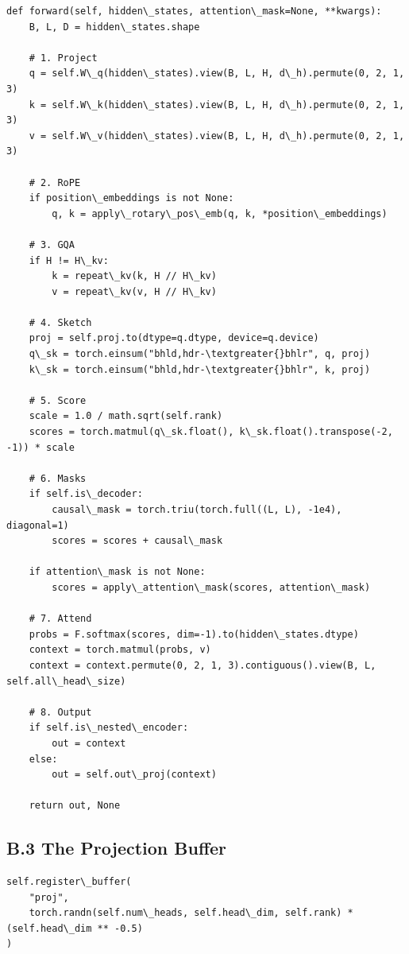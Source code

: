 \begin{lstlisting}
def forward(self, hidden\_states, attention\_mask=None, **kwargs):
    B, L, D = hidden\_states.shape
    
    # 1. Project
    q = self.W\_q(hidden\_states).view(B, L, H, d\_h).permute(0, 2, 1, 3)
    k = self.W\_k(hidden\_states).view(B, L, H, d\_h).permute(0, 2, 1, 3)
    v = self.W\_v(hidden\_states).view(B, L, H, d\_h).permute(0, 2, 1, 3)
    
    # 2. RoPE
    if position\_embeddings is not None:
        q, k = apply\_rotary\_pos\_emb(q, k, *position\_embeddings)
    
    # 3. GQA
    if H != H\_kv:
        k = repeat\_kv(k, H // H\_kv)
        v = repeat\_kv(v, H // H\_kv)
    
    # 4. Sketch
    proj = self.proj.to(dtype=q.dtype, device=q.device)
    q\_sk = torch.einsum("bhld,hdr-\textgreater{}bhlr", q, proj)
    k\_sk = torch.einsum("bhld,hdr-\textgreater{}bhlr", k, proj)
    
    # 5. Score
    scale = 1.0 / math.sqrt(self.rank)
    scores = torch.matmul(q\_sk.float(), k\_sk.float().transpose(-2, -1)) * scale
    
    # 6. Masks
    if self.is\_decoder:
        causal\_mask = torch.triu(torch.full((L, L), -1e4), diagonal=1)
        scores = scores + causal\_mask
    
    if attention\_mask is not None:
        scores = apply\_attention\_mask(scores, attention\_mask)
    
    # 7. Attend
    probs = F.softmax(scores, dim=-1).to(hidden\_states.dtype)
    context = torch.matmul(probs, v)
    context = context.permute(0, 2, 1, 3).contiguous().view(B, L, self.all\_head\_size)
    
    # 8. Output
    if self.is\_nested\_encoder:
        out = context
    else:
        out = self.out\_proj(context)
    
    return out, None
\end{lstlisting}

\subsection{B.3 The Projection Buffer}

\begin{lstlisting}
self.register\_buffer(
    "proj",
    torch.randn(self.num\_heads, self.head\_dim, self.rank) * (self.head\_dim ** -0.5)
)
\end{lstlisting}

